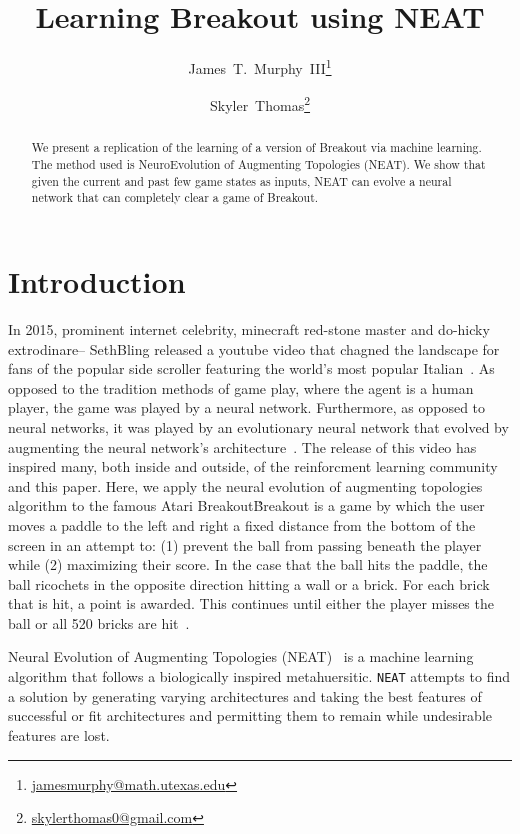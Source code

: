 \documentclass[letterpaper, twocolumn, conference]{article}
\author{James~T.~Murphy~III\thanks{\url{jamesmurphy@math.utexas.edu}}\and{}Skyler~Thomas\thanks{\url{skylerthomas0@gmail.com}}}
\title{Learning Breakout using NEAT}
\begin{document}
\maketitle{}
\begin{abstract}
    We present a replication of the learning of a version of
    Breakout via machine learning.
    The method used is NeuroEvolution of Augmenting Topologies (NEAT).
    We show that given the current and past few game states as inputs, NEAT
    can evolve a neural network that can completely clear a game of Breakout.
\end{abstract}

\section{Introduction}

In 2015, prominent internet celebrity, minecraft red-stone master and do-hicky extrodinare-- SethBling released a youtube video that chagned the landscape for fans of the popular side scroller featuring the world's most popular Italian~\cite{sethbling2015}. As opposed to the tradition methods of game play, where the agent is a human player, the game was played by a neural network. Furthermore, as opposed to neural networks, it was played by an evolutionary neural network that evolved by augmenting the neural network's architecture~\cite{stanley2002evolving}. The release of this video has inspired many, both inside and outside, of the reinforcment learning community and this paper. Here, we apply the neural evolution of augmenting topologies algorithm to the famous Atari Breakout\.

Breakout is a game by which the user moves a paddle to the left and right a fixed distance from the bottom of the screen in an attempt to:
(1) prevent the ball from passing beneath the player while
(2) maximizing their score.
In the case that the ball hits the paddle, the ball ricochets in the opposite direction hitting a wall or a brick.
For each brick that is hit, a point is awarded.
This continues until either the player misses the ball or all 520 bricks are hit~\cite{wiki:breakout}.

Neural Evolution of Augmenting Topologies (NEAT)~\cite{neatpython} is a machine learning algorithm that follows a biologically inspired metahuersitic. \texttt{NEAT} attempts to find a solution by generating varying architectures and taking the best features of successful or fit architectures and permitting them to remain while undesirable features are lost.
\end{document}
